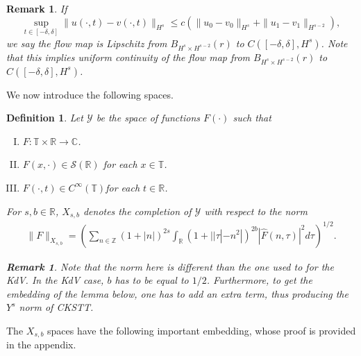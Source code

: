 \documentclass[12pt,reqno]{amsart}
\numberwithin{equation}{section}  %
\newcommand{\rr}{\mathbb{R}}
\newcommand{\zz}{\mathbb{Z}}
\newcommand{\cc}{\mathbb{C}}
\newcommand{\ci}{\mathbb{T}}
\newcommand{\wh}{\widehat}
\newtheorem{definition}[theorem]{Definition}
\newtheorem{remark}[theorem]{Remark}
\begin{document}
%
%
\begin{framed}
\begin{remark}
  If $$\sup_{t \in [-\delta, \delta]}\|u(\cdot, t) - v(\cdot, t)
  \|_{H^{s}} \le c \left( \|u_{0} - v_0 \|_{H^{s}} + \|u_{1} - v_1 \|_{H^{s-2}}
  \right),$$ we
  say the flow map is \emph{Lipschitz} from $B_{H^{s} \times H^{s-2}}(r)$ 
  to $C(\left[ -\delta, \delta \right], H^s)$. 
%
%
Note that this implies uniform continuity of the flow map from $B_{H^{s}
\times H^{s-2}}(r)$ to $C(\left[ -\delta, \delta \right], H^s)$.
\label{rem:lipschitz-cont}
\end{remark}
\end{framed}
%
%
We now introduce the following spaces. 
%
%
\begin{definition}
  Let $\mathcal{Y}$ be the space of functions $F(\cdot)$ such that
  \begin{enumerate}[(I)]
   \item{$F: \ci \times \rr \to \cc$}.
   \item{$F(x, \cdot) \in \mathcal{S}(\rr)$ for each $x \in \ci$}.
   \item{$F(\cdot, t) \in C^{\infty}(\ci)$for each $t \in \rr$}.
  \end{enumerate}
  For $s, b \in \rr$, $X_{s,b}$ denotes the completion of $\mathcal{Y}$ with
  respect to the norm
  \begin{equation}
  \begin{split}
    \|F\|_{X_{s,b}} = \left( \sum_{n \in \zz} (1 + |n|)^{2s} \int_{\rr}
    (1 + | | \tau | - n^{2} |)^{2b} |\wh{F}(n, \tau)|^{2} d \tau\right)^{1/2}.
  \end{split}
  \label{eqn:bous-norm}
  \end{equation}
  \begin{framed}
    \begin{remark}
    Note that the norm here is different than the one used to for the KdV. In
    the KdV case, $b$ has to be equal to $1/2$. Furthermore, to get the embedding
    of the lemma below, one has to add an extra term, thus producing the
    $Y^{s}$ norm of CKSTT\@.
    \label{rem:alternate-space}
    \end{remark}
  \end{framed}
\end{definition}
%
The $X_{s,b}$ spaces have the following important embedding, whose proof is
provided in the appendix.
%
%
%
%
%
%
\end{document}
